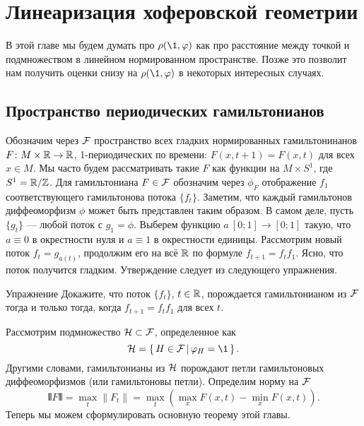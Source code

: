 \chapter{Линеаризация хоферовской геометрии}

В этой главе мы будем думать про $\rho (\1, \phi)$ как про расстояние между точкой и подмножеством в линейном нормированном пространстве.
Позже это позволит нам получить оценки снизу на $\rho (\1, \phi)$ в некоторых интересных случаях.

\section{Пространство периодических гамильтонианов}

Обозначим через $\mathcal{F}$ пространство всех гладких нормированных гамильтонинанов $F\colon M \times \mathbb{R} \to \mathbb{R}$, 1-периодических по времени: $F (x, t + 1) = F (x, t)$ для всех $x \in M$.
Мы часто будем рассматривать такие $F$ как функции на $M \times S^1$, где $S^1 = \mathbb{R} / \mathbb{Z}$.
Для гамильтониана $F \in \mathcal{F}$ обозначим через $\phi_F$ отображение $f_1$ соответствующего гамильтонова потока $\{f_t\}$.
Заметим, что каждый гамильтонов диффеоморфизм $\phi$ может быть представлен таким образом.
В самом деле, пусть $\{g_t\}$ --- любой поток с $g_1 = \phi$.
Выберем функцию $a\: [0; 1] \to [0; 1]$ такую, что $a \equiv 0$ в окрестности нуля и $a \equiv 1$ в окрестности единицы.
Рассмотрим новый поток $f_t = g_{a(t)}$, 
продолжим его на всё $\mathbb{R}$ по формуле $f_{t+1} = f_t f_1$.
Ясно, что поток получится гладким.
Утверждение следует из следующего упражнения.

\begin{thm}{Упражнение}\label{5.1.A}
Докажите, что  поток $\{f_t\}$, $t \in \mathbb{R}$, порождается гамильтонианом из $\mathcal{F}$ тогда и только тогда, когда $f_{t+1} = f_t f_1$ для всех $t$.
\end{thm}

Рассмотрим подмножество $\mathcal{H} \subset \mathcal{F}$, определенное как 
\[\H = \set{H \in \F}{\phi_H = \1}.\]
Другими словами, гамильтонианы из $\mathcal{H}$ порождают петли гамильтоновых диффеоморфизмов (или гамильтоновы петли).
Определим норму на $\mathcal{F}$ 
\[\VERT F \VERT = \max_{t} \| F_t \| = \max_{t} (\max_{x} F (x, t) -
\min_{x} F (x, t)).\]
Теперь мы можем сформулировать основную теорему этой главы.

